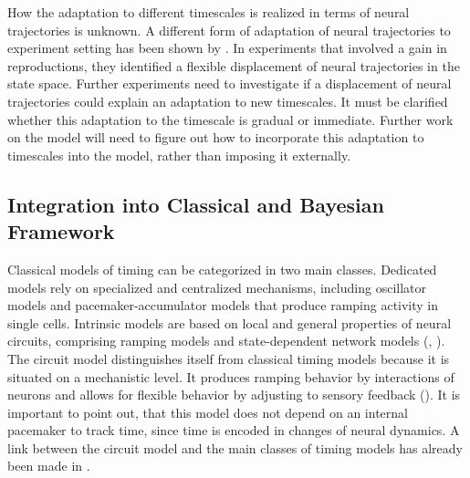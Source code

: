 \documentclass[10pt]{article}
\begin{document}
How the adaptation to different timescales is realized in terms of neural trajectories is unknown. 
A different form of adaptation of neural trajectories to experiment setting has been shown by \cite{Remington2018}. In experiments that involved a gain in reproductions, they identified a flexible displacement of neural trajectories in the state space.
Further experiments need to investigate if a displacement of neural trajectories could explain an adaptation to new timescales. It must be clarified whether this adaptation to the timescale is gradual or immediate. 
Further work on the model will need to figure out how to incorporate this adaptation to timescales into the model, rather than imposing it externally.

\subsection{Integration into Classical and Bayesian Framework}
Classical models of timing can be categorized in two main classes. 
Dedicated models rely on specialized and centralized mechanisms, including oscillator models and pacemaker-accumulator models that produce ramping activity in single cells.
Intrinsic models are based on local and general properties of neural circuits, comprising ramping models and state-dependent network models (\cite{Paton2018}, \cite{Goel2014}).
The circuit model distinguishes itself from classical timing models because it is situated on a mechanistic level. 
It produces ramping behavior by interactions of neurons and allows for flexible behavior by adjusting to sensory feedback (\cite{Egger2020}).
It is important to point out, that this model does not depend on an internal pacemaker to track time, since time is encoded in changes of neural dynamics.  
A link between the circuit model and the main classes of timing models has already been made in \cite{Egger2020}.
\end{document}

